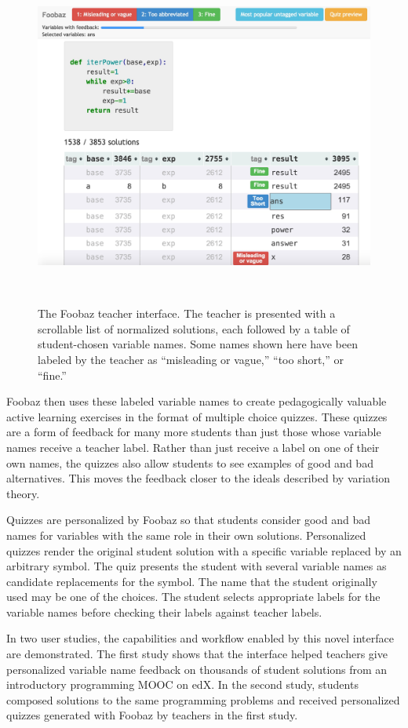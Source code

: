 \begin{figure}
\centering
\includegraphics[width=0.75\linewidth]{Body/figures/foobaz/FoobazInitialView4.jpg}
\caption{The Foobaz teacher interface. The teacher is presented with a scrollable list of normalized solutions, each followed by a table of student-chosen variable names. Some names shown here have been labeled by the teacher as ``misleading or vague,'' ``too short,'' or ``fine.''}
~\label{fig:figure2}
\end{figure}

Foobaz then uses these labeled variable names to create pedagogically valuable active learning exercises in the format of multiple choice quizzes. These quizzes are a form of feedback for many more students than just those whose variable names receive a teacher label. Rather than just receive a label on one of their own names, the quizzes also allow students to see examples of good and bad alternatives. This moves the feedback closer to the ideals described by variation theory.

Quizzes are personalized by Foobaz so that students consider good and bad names for variables with the same role in their own solutions. Personalized quizzes render the original student solution with a specific variable replaced by an arbitrary symbol. The quiz presents the student with several variable names as candidate replacements for the symbol. The name that the student originally used may be one of the choices. The student selects appropriate labels for the variable names before checking their labels against teacher labels.

In two user studies, the capabilities and workflow enabled by this novel interface are demonstrated. The first study shows that the interface helped teachers give personalized variable name feedback on thousands of student solutions from an introductory programming MOOC on edX. In the second study, students composed solutions to the same programming problems and received personalized quizzes generated with Foobaz by teachers in the first study.

